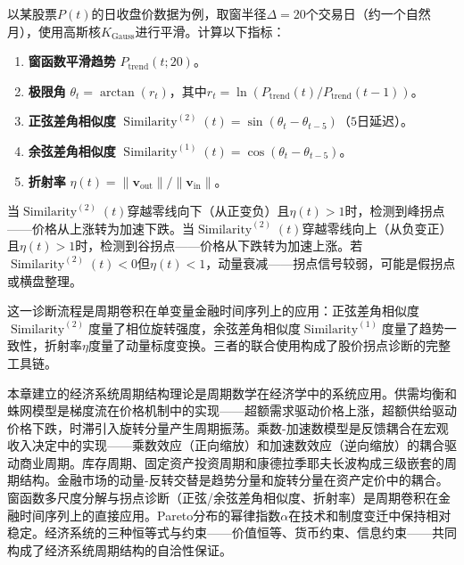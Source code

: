 \begin{example}[股价拐点检测的窗函数应用]
以某股票$P(t)$的日收盘价数据为例，取窗半径$\Delta = 20$个交易日（约一个自然月），使用高斯核$K_{\text{Gauss}}$进行平滑。计算以下指标：
\begin{enumerate}[label=(\roman*)]
    \item \textbf{窗函数平滑趋势} $P_{\text{trend}}(t; 20)$。
    \item \textbf{极限角} $\theta_t = \arctan(r_t)$，其中$r_t = \ln(P_{\text{trend}}(t)/P_{\text{trend}}(t-1))$。
    \item \textbf{正弦差角相似度} $\operatorname{Similarity}^{(2)}(t) = \sin(\theta_t - \theta_{t-5})$（$5$日延迟）。
    \item \textbf{余弦差角相似度} $\operatorname{Similarity}^{(1)}(t) = \cos(\theta_t - \theta_{t-5})$。
    \item \textbf{折射率} $\eta(t) = \|\mathbf{v}_{\text{out}}\|/\|\mathbf{v}_{\text{in}}\|$。
\end{enumerate}
当$\operatorname{Similarity}^{(2)}(t)$穿越零线向下（从正变负）且$\eta(t) > 1$时，检测到峰拐点——价格从上涨转为加速下跌。当$\operatorname{Similarity}^{(2)}(t)$穿越零线向上（从负变正）且$\eta(t) > 1$时，检测到谷拐点——价格从下跌转为加速上涨。若$\operatorname{Similarity}^{(2)}(t) < 0$但$\eta(t) < 1$，动量衰减——拐点信号较弱，可能是假拐点或横盘整理。

这一诊断流程是周期卷积在单变量金融时间序列上的应用：正弦差角相似度$\operatorname{Similarity}^{(2)}$度量了相位旋转强度，余弦差角相似度$\operatorname{Similarity}^{(1)}$度量了趋势一致性，折射率$\eta$度量了动量标度变换。三者的联合使用构成了股价拐点诊断的完整工具链。
\end{example}

\begin{remark}[与全书的统一]
本章建立的经济系统周期结构理论是周期数学在经济学中的系统应用。供需均衡和蛛网模型是梯度流在价格机制中的实现——超额需求驱动价格上涨，超额供给驱动价格下跌，时滞引入旋转分量产生周期振荡。乘数-加速数模型是反馈耦合在宏观收入决定中的实现——乘数效应（正向缩放）和加速数效应（逆向缩放）的耦合驱动商业周期。库存周期、固定资产投资周期和康德拉季耶夫长波构成三级嵌套的周期结构。金融市场的动量-反转交替是趋势分量和旋转分量在资产定价中的耦合。窗函数多尺度分解与拐点诊断（正弦/余弦差角相似度、折射率）是周期卷积在金融时间序列上的直接应用。Pareto分布的幂律指数$\alpha$在技术和制度变迁中保持相对稳定。经济系统的三种恒等式与约束——价值恒等、货币约束、信息约束——共同构成了经济系统周期结构的自洽性保证。
\end{remark}

